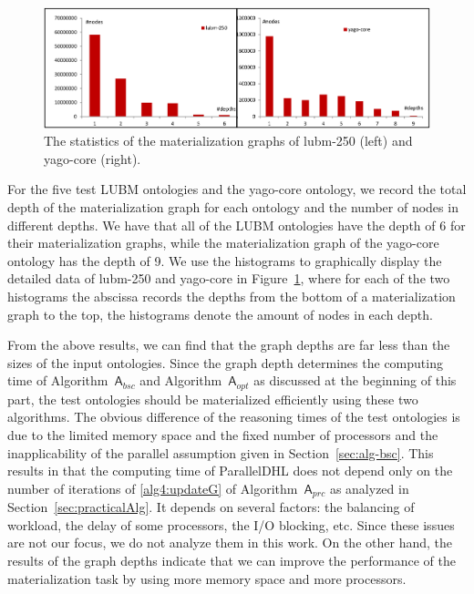 \begin{figure}[htbp]
\begin{center}
\includegraphics[width=1\textwidth]{fig-graphdepth.eps}
\caption{The statistics of the materialization graphs of lubm-250 (left) and yago-core (right).}
\label{fig:graphdepth}
\end{center}
\end{figure}

For the five test LUBM ontologies and the yago-core ontology, we record the total depth
of the materialization graph for each ontology and the number of nodes in different depths.
We have that all of the LUBM ontologies have the depth of 6 for their
materialization graphs, while the materialization graph of the yago-core ontology
has the depth of 9.
We use the histograms to graphically display the detailed data of lubm-250 and yago-core in Figure~\ref{fig:graphdepth},
where for each of the two histograms
the abscissa records the depths from the bottom of a materialization graph to the top,
the histograms denote the amount of nodes in each depth.

From the above results, we can find that the graph depths are far less than
the sizes of the input ontologies. Since the graph depth determines the computing
time of Algorithm~$\mathsf{A}_{bsc}$ and Algorithm~$\mathsf{A}_{opt}$ as discussed
at the beginning of this part,
the test ontologies should be materialized efficiently using these two algorithms.
The obvious difference of the reasoning times of the test ontologies is due to the limited memory space and the fixed number
of processors and the inapplicability of the parallel assumption given in Section~\ref{sec:alg-bsc}.
This results in that the computing
time of ParallelDHL does not depend only on the number of iterations of \ref{alg4:updateG}
of Algorithm~$\mathsf{A}_{prc}$ as analyzed in Section~\ref{sec:practicalAlg}.
It depends on several factors: the balancing of workload, the delay of some processors,
the I/O blocking, etc. Since these issues are not our focus, we do not analyze them in this work.
On the other hand, the results of the graph depths
indicate that we can improve the performance of the materialization task by using more
memory space and more processors.



